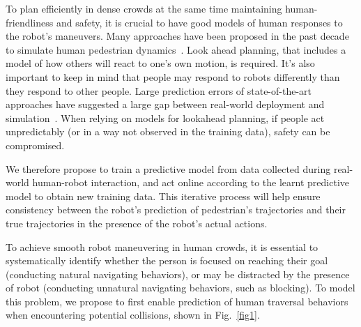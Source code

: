 \documentclass[conference]{IEEEtran}
\begin{document}
To plan efficiently in dense crowds at the same time maintaining 
human-friendliness and safety, it is crucial to have good models of human 
responses to the robot's maneuvers. Many approaches have been proposed in the 
past decade to simulate human pedestrian dynamics~\cite{lamarche2004crowd, 
  treuille2006continuum, %
karamouzas2009predictive}.
Look ahead planning, that includes a model of how others will react to one's 
own motion, is required. It's also important to keep in mind that people may 
respond to robots differently than they respond to other people. Large 
prediction errors of state-of-the-art approaches have suggested a large gap 
between real-world deployment and 
simulation~\cite{trautman2015robot,pfeiffer2016predicting}. When 
relying on models for lookahead planning, if people act unpredictably (or in a 
way not observed in the training data), safety can be compromised. 

We therefore propose to train a predictive model from 
data collected during real-world human-robot interaction, and 
act online according to the learnt predictive model to obtain new training data. 
This iterative process will help ensure consistency between the robot's 
prediction of pedestrian's trajectories and their true trajectories in the 
presence of the robot's actual actions.


To achieve smooth robot maneuvering in human crowds, it is essential to 
systematically identify whether the person is focused on 
reaching their goal (conducting natural navigating behaviors), or may be 
distracted by the presence of robot (conducting unnatural navigating 
behaviors, such as blocking). To model this problem, we propose to first 
enable prediction of human traversal behaviors when encountering potential 
collisions, shown in Fig.~\ref{fig1}. 

\end{document}
